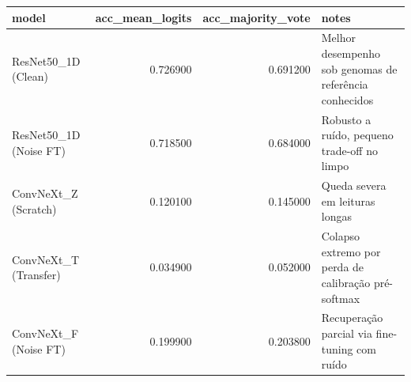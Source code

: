 \begin{tabular}{lrrl}
\toprule
model & acc_mean_logits & acc_majority_vote & notes \\
\midrule
ResNet50_1D (Clean) & 0.726900 & 0.691200 & Melhor desempenho sob genomas de referência conhecidos \\
ResNet50_1D (Noise FT) & 0.718500 & 0.684000 & Robusto a ruído, pequeno trade-off no limpo \\
ConvNeXt_Z (Scratch) & 0.120100 & 0.145000 & Queda severa em leituras longas \\
ConvNeXt_T (Transfer) & 0.034900 & 0.052000 & Colapso extremo por perda de calibração pré-softmax \\
ConvNeXt_F (Noise FT) & 0.199900 & 0.203800 & Recuperação parcial via fine-tuning com ruído \\
\bottomrule
\end{tabular}

